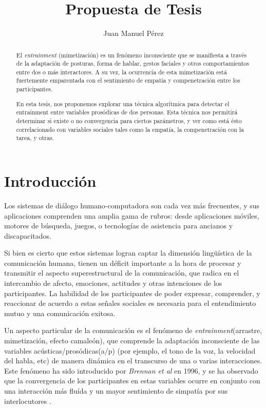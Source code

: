 \documentclass[a4paper,11pt]{article}
\title{Propuesta de Tesis}
\author{Juan Manuel Pérez}
\begin{document}
\maketitle

\begin{abstract}

El \emph{entrainment} (mimetización) es un fenómeno inconsciente que se manifiesta a través de la adaptación de posturas, forma de hablar, gestos faciales y otros comportamientos entre dos o más interactores. A su vez, la ocurrencia de esta mimetización está fuertemente emparentada con el sentimiento de empatía y compenetración entre los participantes.

En esta tesis, nos proponemos explorar una técnica algorítmica para detectar el entrainment entre variables prosódicas de dos personas. Esta técnica nos permitirá determinar si existe o no convergencia para ciertos parámetros, y ver como está ésto correlacionado con variables sociales tales como la empatía, la compenetración con la tarea, y otras.


\end{abstract}


\section*{Introducción}

Los sistemas de diálogo humano-computadora son cada vez más frecuentes, y sus aplicaciones comprenden una amplia gama de rubros: desde aplicaciones móviles, motores de búsqueda, juegos, o tecnologías de asistencia para ancianos y discapacitados.

Si bien es cierto que estos sistemas logran captar la dimensión lingüística de la comunicación humana, tienen un déficit importante a la hora de procesar y transmitir el aspecto superestructural de la comunicación, que radica en el intercambio de afecto, emociones, actitudes y otras intenciones de los participantes. La habilidad de los participantes de poder expresar, comprender, y reaccionar de acuerdo a estas señales sociales es necesaria para el entendimiento mutuo y una comunicación exitosa.

Un aspecto particular de la comunicación es el fenómeno de \emph{entrainment}(arrastre, mimetización, efecto camaleón), que comprende la adaptación inconsciente de las variables acústicas/prosódicas(a/p) (por ejemplo, el tono de la voz, la velocidad del habla, etc) de manera dinámica en el transcurso de una o varias interacciones. Este fenómeno ha sido introducido por \emph{Brennan et al}\cite{BRE1996} en 1996, y se ha observado que la convergencia de los participantes en estas variables ocurre en conjunto con una interacción más fluída y un mayor sentimiento de simpatía por sus interlocutores \cite{CHAR1999}.
\end{document}
